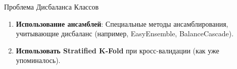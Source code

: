 \begin{textbox}{Проблема Дисбаланса Классов}
\begin{itemize}
\begin{enumerate}
                \item \textbf{Использование ансамблей}: Специальные методы ансамблирования, учитывающие дисбаланс (например, EasyEnsemble, BalanceCascade).
                \item \textbf{Использовать Stratified K-Fold} при кросс-валидации (как уже упоминалось).
            \end{enumerate}
    \end{itemize}
\end{textbox}

